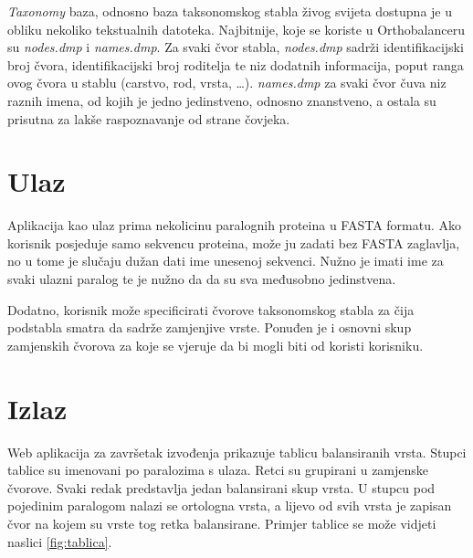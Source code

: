 \emph{Taxonomy} baza, odnosno baza taksonomskog stabla živog svijeta
dostupna je u obliku nekoliko tekstualnih datoteka. Najbitnije, koje se koriste
u Orthobalanceru su \emph{nodes.dmp} i \emph{names.dmp}. Za svaki čvor stabla,
\emph{nodes.dmp} sadrži identifikacijski broj čvora, identifikacijski broj
roditelja te niz dodatnih informacija, poput ranga ovog čvora u stablu (carstvo,
rod, vrsta, \ldots). \emph{names.dmp} za svaki čvor čuva niz raznih imena, od
kojih je jedno jedinstveno, odnosno znanstveno, a ostala su prisutna za lakše
raspoznavanje od strane čovjeka.


\section{Ulaz}
\label{sec:input}

Aplikacija kao ulaz prima nekolicinu paralognih proteina u FASTA formatu. Ako
korisnik posjeduje samo sekvencu proteina, može ju zadati bez FASTA zaglavlja,
no u tome je slučaju dužan dati ime unesenoj sekvenci. Nužno je imati ime za svaki
ulazni paralog te je nužno da da su sva međusobno jedinstvena.

Dodatno, korisnik može specificirati čvorove taksonomskog stabla za čija
podstabla smatra da sadrže zamjenjive vrste. Ponuđen je i osnovni skup
zamjenskih čvorova za koje se vjeruje da bi mogli biti od koristi korisniku.


\section{Izlaz}
\label{sec:output}

Web aplikacija za završetak izvođenja prikazuje tablicu balansiranih vrsta.
Stupci tablice su imenovani po paralozima s ulaza. Retci su grupirani u
zamjenske čvorove. Svaki redak predstavlja jedan balansirani skup vrsta. U
stupcu pod pojedinim paralogom nalazi se ortologna vrsta, a lijevo od svih vrsta
je zapisan čvor na kojem su vrste tog retka balansirane. Primjer tablice se može
vidjeti naslici \ref{fig:tablica}.

